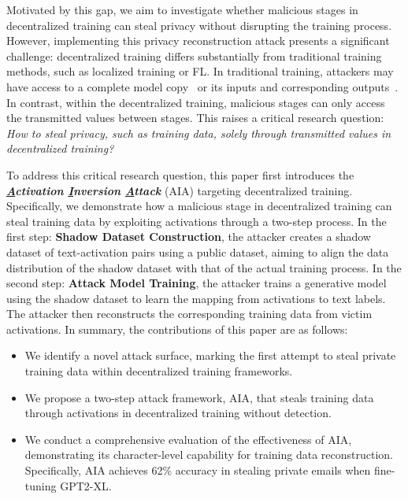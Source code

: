 Motivated by this gap, we aim to investigate whether malicious stages in decentralized training can steal privacy without disrupting the training process. However, implementing this privacy reconstruction attack presents a significant challenge: decentralized training differs substantially from traditional training methods, such as localized training or FL. In traditional training, attackers may have access to a complete model copy~\cite{li2023sentence,morris2023text} or its inputs and corresponding outputs~\cite{huang2024transferable}. In contrast, within the decentralized training, malicious stages can only access the transmitted values between stages. This raises a critical research question: \textit{How to steal privacy, such as training data, solely through transmitted values in decentralized training?}


To address this critical research question, this paper first introduces the \textbf{\textit{\underline{A}ctivation \underline{I}nversion \underline{A}ttack}} (AIA) targeting decentralized training. Specifically, we demonstrate how a malicious stage in decentralized training can steal training data by exploiting activations through a two-step process. In the first step: \textbf{Shadow Dataset Construction}, the attacker creates a shadow dataset of text-activation pairs using a public dataset, aiming to align the data distribution of the shadow dataset with that of the actual training process. In the second step: \textbf{Attack Model Training}, the attacker trains a generative model using the shadow dataset to learn the mapping from activations to text labels. The attacker then reconstructs the corresponding training data from victim activations. In summary, the contributions of this paper are as follows:


\begin{itemize}[nolistsep, leftmargin=*, topsep=0pt]

    \item We identify a novel attack surface, marking the first attempt to steal private training data within decentralized training frameworks.

    \item We propose a two-step attack framework, AIA, that steals training data through activations in decentralized training without detection.

    \item We conduct a comprehensive evaluation of the effectiveness of AIA, demonstrating its character-level capability for training data reconstruction. Specifically, AIA achieves 62\% accuracy in stealing private emails when fine-tuning GPT2-XL.
    
\end{itemize}